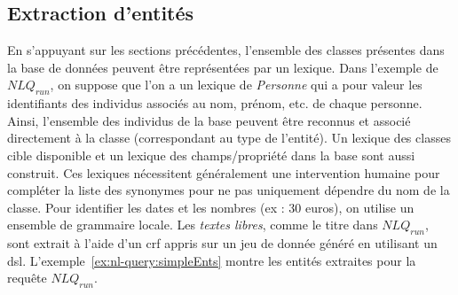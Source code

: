 \subsection{Extraction d'entités}

En s'appuyant sur les sections précédentes, l'ensemble des classes présentes dans la base de données peuvent être représentées par un lexique.
Dans l'exemple de $NLQ_{run}$, on suppose que l'on a un lexique de \emph{Personne} qui a pour valeur les identifiants des individus associés au nom, prénom, etc. de chaque personne.
Ainsi, l'ensemble des individus de la base peuvent être reconnus et associé directement à la classe (correspondant au type de l'entité).
Un lexique des classes cible disponible et un lexique des champs/propriété dans la base sont aussi construit.
Ces lexiques nécessitent généralement une intervention humaine pour compléter la liste des synonymes pour ne pas uniquement dépendre du nom de la classe.
Pour identifier les dates et les nombres (ex : 30 euros), on utilise un ensemble de grammaire locale.
Les \emph{textes libres}, comme le titre dans $NLQ_{run}$, sont extrait à l'aide d'un \gls{crf} appris sur un jeu de donnée généré en utilisant un \gls{dsl}.
L'exemple~\ref{ex:nl-query:simpleEnts} montre les entités extraites pour la requête $NLQ_{run}$.

